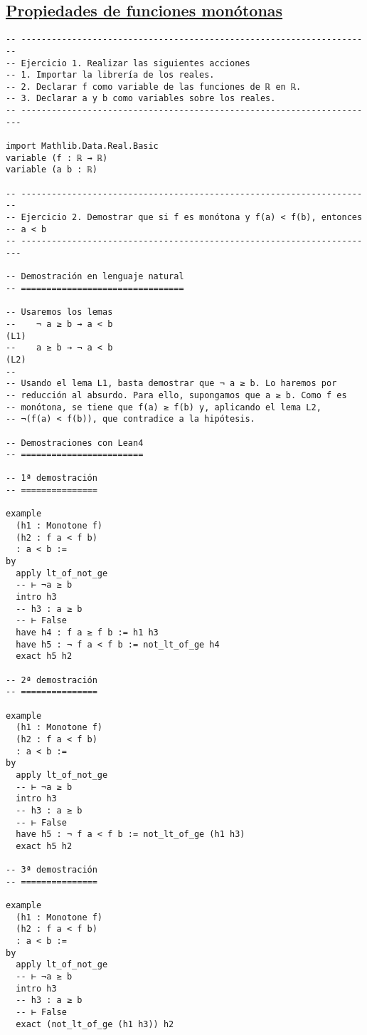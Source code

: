 \subsection{\href{./src/Logica/Propiedades\_de\_funciones\_monotonas.lean}{Propiedades de funciones monótonas}}
\label{sec:orgc27b95f}
\begin{verbatim}
-- ---------------------------------------------------------------------
-- Ejercicio 1. Realizar las siguientes acciones
-- 1. Importar la librería de los reales.
-- 2. Declarar f como variable de las funciones de ℝ en ℝ.
-- 3. Declarar a y b como variables sobre los reales.
-- ----------------------------------------------------------------------

import Mathlib.Data.Real.Basic
variable (f : ℝ → ℝ)
variable (a b : ℝ)

-- ---------------------------------------------------------------------
-- Ejercicio 2. Demostrar que si f es monótona y f(a) < f(b), entonces
-- a < b
-- ----------------------------------------------------------------------

-- Demostración en lenguaje natural
-- ================================

-- Usaremos los lemas
--    ¬ a ≥ b → a < b                                                (L1)
--    a ≥ b → ¬ a < b                                                (L2)
--
-- Usando el lema L1, basta demostrar que ¬ a ≥ b. Lo haremos por
-- reducción al absurdo. Para ello, supongamos que a ≥ b. Como f es
-- monótona, se tiene que f(a) ≥ f(b) y, aplicando el lema L2,
-- ¬(f(a) < f(b)), que contradice a la hipótesis.

-- Demostraciones con Lean4
-- ========================

-- 1ª demostración
-- ===============

example
  (h1 : Monotone f)
  (h2 : f a < f b)
  : a < b :=
by
  apply lt_of_not_ge
  -- ⊢ ¬a ≥ b
  intro h3
  -- h3 : a ≥ b
  -- ⊢ False
  have h4 : f a ≥ f b := h1 h3
  have h5 : ¬ f a < f b := not_lt_of_ge h4
  exact h5 h2

-- 2ª demostración
-- ===============

example
  (h1 : Monotone f)
  (h2 : f a < f b)
  : a < b :=
by
  apply lt_of_not_ge
  -- ⊢ ¬a ≥ b
  intro h3
  -- h3 : a ≥ b
  -- ⊢ False
  have h5 : ¬ f a < f b := not_lt_of_ge (h1 h3)
  exact h5 h2

-- 3ª demostración
-- ===============

example
  (h1 : Monotone f)
  (h2 : f a < f b)
  : a < b :=
by
  apply lt_of_not_ge
  -- ⊢ ¬a ≥ b
  intro h3
  -- h3 : a ≥ b
  -- ⊢ False
  exact (not_lt_of_ge (h1 h3)) h2


\end{verbatim}
